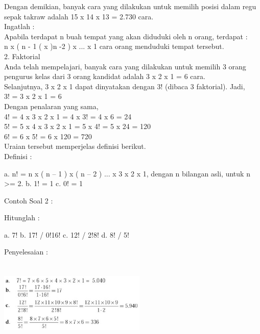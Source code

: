 \documentclass[11pt,fleqn]{book} %
\begin{document}
Dengan demikian, banyak cara yang dilakukan untuk memilih posisi dalam regu sepak takraw adalah  15 x 14 x 13 = 2.730 cara.\\

Ingatlah :\\

Apabila terdapat n buah tempat yang akan diduduki oleh n orang, terdapat :\\

n x ( n - 1 ( x )n -2 ) x ... x 1 cara orang menduduki tempat tersebut.\\

2. Faktorial\\

Anda telah mempelajari, banyak cara yang dilakukan untuk memilih 3 orang pengurus kelas dari 3 orang kandidat adalah 3 x 2 x 1 = 6 cara.\\

Selanjutnya, 3 x 2 x 1 dapat dinyatakan dengan 3! (dibaca 3 faktorial). Jadi,\\

3! = 3 x 2 x 1 = 6\\

Dengan penalaran yang sama,\\

4! = 4 x 3 x 2 x 1 = 4 x 3! = 4 x 6 = 24\\
5! = 5 x 4 x 3 x 2 x 1 = 5 x 4! = 5 x 24 = 120\\
6! = 6 x 5! = 6 x 120 = 720\\

Uraian tersebut memperjelas definisi berikut.\\

Definisi :

a. n! = n x ( n – 1 ) x ( n – 2 ) ... x 3 x 2 x 1, dengan n bilangan asli, untuk n >=  2.
b. 1! = 1
c. 0! = 1

Contoh Soal 2 :

Hitunglah :

a. 7!
b. 17! / 0!16!
c. 12! / 2!8!
d. 8! / 5!

Penyelesaian :


\includegraphics[width = 7cm, height= 4cm]{Pictures/gen3.png}
\end{document}
